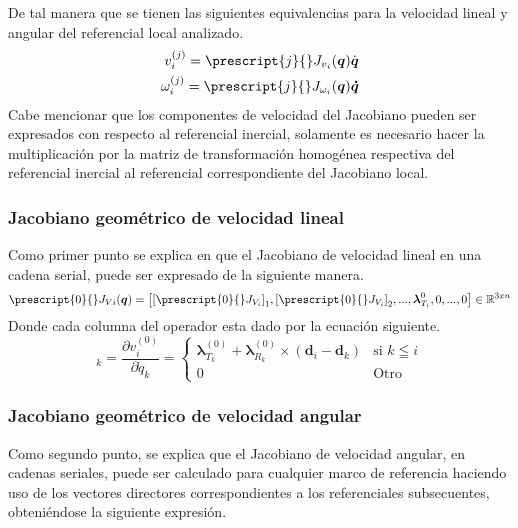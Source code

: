         De tal manera que se tienen las siguientes equivalencias para la velocidad lineal y angular del 
        referencial local analizado.
        \begin{align*}
            v^{(j)}_i = \prescript{j}{}J_{v_i}(\boldsymbol{q})\dot{\boldsymbol{q}} \\
            \omega^{(j)}_i = \prescript{j}{}J_{\omega_i}(\boldsymbol{q})\boldsymbol{\dot{q}}
        \end{align*}
        Cabe mencionar que los componentes de velocidad del Jacobiano pueden ser expresados 
        con respecto al referencial inercial, solamente es necesario hacer la multiplicación 
        por la matriz de transformación homogénea respectiva del referencial inercial al referencial 
        correspondiente del Jacobiano local.

    \subsubsection{Jacobiano geométrico de velocidad lineal}
        \noindent Como primer punto se explica en \cite{3DMotion} que el Jacobiano de velocidad lineal 
        en una cadena serial, puede ser expresado de la siguiente manera.
        \begin{equation}
            \prescript{0}{}J_{Vi}(\boldsymbol{q}) = 
            \left[{[\prescript{0}{}J_{V_i}]}_1, {[\prescript{0}{}J_{V_i}]}_2, ..., \boldsymbol{\lambda}^{0}_{T_i}, 0, ..., 0\right]
            \in \mathbb{R}^{3xn}
            \label{eq:Jv}
        \end{equation}
        Donde cada columna del operador esta dado por la ecuación siguiente.
        \begin{equation*}
            [\prescript{0}{}J_{Vi}]_k = \frac{\partial v^{(0)}_i}{\partial \dot{q}_k} = 
            \begin{cases}
                \boldsymbol{\lambda}^{(0)}_{T_k} + \boldsymbol{\lambda}^{(0)}_{R_k} \times (\boldsymbol{d}_i - \boldsymbol{d}_k) & \text{si } k \leqq i \\
                0                                                          & \text{Otro}
            \end{cases}
        \end{equation*}
    \subsubsection{Jacobiano geométrico de velocidad angular}
        \noindent Como segundo punto, se explica que el Jacobiano de velocidad angular, 
        en cadenas seriales, puede ser calculado para cualquier marco de referencia 
        haciendo uso de los vectores directores correspondientes a los referenciales 
        subsecuentes, obteniéndose la siguiente expresión.

